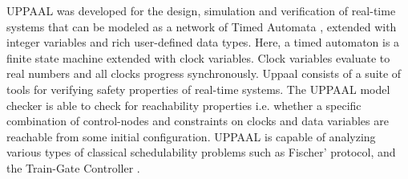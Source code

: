 UPPAAL \cite{larsen1997uppaal, bengtsson1996uppaal, david2009model} was developed for the design, simulation and verification of real-time systems that can be modeled as a network of Timed Automata \cite{Alur1994}, extended with integer variables and rich user-defined data types. Here, a timed automaton is a finite state machine extended with clock variables. Clock variables evaluate to real numbers and all clocks progress synchronously. Uppaal consists of a suite of tools for verifying safety properties of real-time systems. The UPPAAL model checker is able to check for reachability properties i.e. whether a specific combination of control-nodes and constraints on clocks and data variables are reachable from some initial configuration. UPPAAL is capable of analyzing various types of classical schedulability problems such as Fischer' protocol, and the Train-Gate Controller \cite{bengtsson1996uppaal}.




\fi

